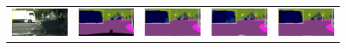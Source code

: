 \documentclass[letterpaper]{article} %
\begin{document}
\begin{figure}[!t]
\begin{tabular}{ccccc}
  \includegraphics[width=0.19\linewidth]{image/figure6/2a.png}\label{2a} &
  \hspace{-12pt}
  \includegraphics[width=0.19\linewidth]{image/figure6/2b.png}\label{2b} &
  \hspace{-12pt}
  \includegraphics[width=0.19\linewidth]{image/figure6/2c.png}\label{2c} &
  \hspace{-12pt}
  \includegraphics[width=0.19\linewidth]{image/figure6/2d.png}\label{2d} &
  \hspace{-12pt}
  \includegraphics[width=0.19\linewidth]{image/figure6/2e}\label{2e} \\
  

\end{tabular}
\end{figure}
\end{document}
